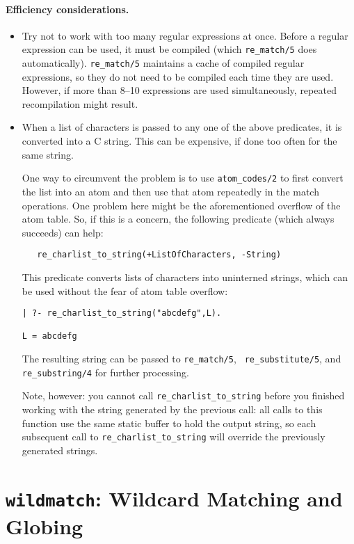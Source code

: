 \paragraph{Efficiency considerations.}
\begin{itemize}
  \item  Try not to work with too many regular expressions at once.
    Before a regular expression can be used, it must be compiled (which
    {\tt re\_match/5} does automatically).
    {\tt re\_match/5} maintains a cache of compiled regular expressions, so
    they do not need to be compiled each time they are used. However, if
    more than 8--10 expressions are used simultaneously, repeated
    recompilation might result.
  \item When a list of characters is passed to any one of the above
    predicates, it is converted into a C string. This can be expensive, if
    done too often for the same string.
    
    One way to circumvent the problem is to use {\tt atom\_codes/2} to
    first convert the list into an atom and then use that atom repeatedly
    in the match operations. One problem here might be the aforementioned
    overflow of the atom table. So, if this is a concern, the following
    predicate (which always succeeds) can help:
\begin{verbatim}
   re_charlist_to_string(+ListOfCharacters, -String)  
\end{verbatim}
    This predicate converts lists of characters into uninterned strings,
    which can be used without the fear of atom table overflow:
\begin{verbatim}
| ?- re_charlist_to_string("abcdefg",L).

L = abcdefg  
\end{verbatim}
    The resulting string can be passed to {\tt re\_match/5}, {\tt
    re\_substitute/5}, and {\tt re\_substring/4} for further processing.
  
  Note, however: you cannot call {\tt re\_charlist\_to\_string} before you
  finished working with the string generated by the previous call: all
  calls to this function use the same static buffer to hold the output
  string, so each subsequent call to {\tt re\_charlist\_to\_string} will
  override the previously generated strings.
\end{itemize}


\section{{\tt wildmatch}: Wildcard Matching and Globing}

